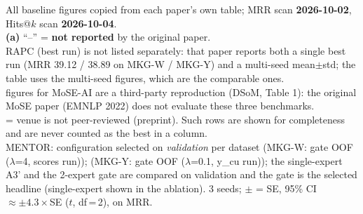 \begin{table}[t]
\vspace{2pt}
\begin{minipage}{\linewidth}\footnotesize\raggedright
All baseline figures copied from each paper's own table; MRR scan \textbf{2026-10-02}, Hits@$k$ scan \textbf{2026-10-04}. \\
\textbf{(a)} ``--'' = \textbf{not reported} by the original paper. \\
RAPC (best run) is not listed separately: that paper reports both a single best run (MRR 39.12 / 38.89 on MKG-W / MKG-Y) and a multi-seed mean$\pm$std; the table uses the multi-seed figures, which are the comparable ones. \\
\dag{} figures for MoSE-AI are a third-party reproduction (DSoM, Table 1): the original MoSE paper (EMNLP 2022) does not evaluate these three benchmarks. \\
\ddag{} = venue is not peer-reviewed (preprint). Such rows are shown for completeness and are never counted as the best in a column. \\
MENTOR: configuration selected on \emph{validation} per dataset (MKG-W: gate OOF ($\lambda$=4, scores run)); (MKG-Y: gate OOF ($\lambda$=0.1, y\_cu run)); the single-expert A3' and the 2-expert gate are compared on validation and the gate is the selected headline (single-expert shown in the ablation). 3 seeds; $\pm$ = SE, 95\% CI $\approx \pm 4.3\times$SE ($t$, df\,=\,2), on MRR. \\
\end{minipage}
\end{table}
